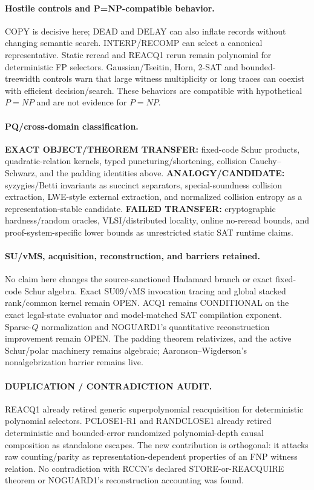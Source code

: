 \documentclass[11pt]{article}
\begin{document}
\paragraph{Hostile controls and P=NP-compatible behavior.}
COPY is decisive here; DEAD and DELAY can also inflate records without changing semantic search. INTERP/RECOMP can select a canonical representative. Static reread and REACQ1 rerun remain polynomial for deterministic FP selectors. Gaussian/Tseitin, Horn, 2-SAT and bounded-treewidth controls warn that large witness multiplicity or long traces can coexist with efficient decision/search. These behaviors are compatible with hypothetical $P=NP$ and are not evidence for $P=NP$.

\paragraph{PQ/cross-domain classification.}
\textbf{EXACT OBJECT/THEOREM TRANSFER:} fixed-code Schur products, quadratic-relation kernels, typed puncturing/shortening, collision Cauchy--Schwarz, and the padding identities above. \textbf{ANALOGY/CANDIDATE:} syzygies/Betti invariants as succinct separators, special-soundness collision extraction, LWE-style external extraction, and normalized collision entropy as a representation-stable candidate. \textbf{FAILED TRANSFER:} cryptographic hardness/random oracles, VLSI/distributed locality, online no-reread bounds, and proof-system-specific lower bounds as unrestricted static SAT runtime claims.

\paragraph{SU/vMS, acquisition, reconstruction, and barriers retained.}
No claim here changes the source-sanctioned Hadamard branch or exact fixed-code Schur algebra. Exact SU09/vMS invocation tracing and global stacked rank/common kernel remain OPEN. ACQ1 remains CONDITIONAL on the exact legal-state evaluator and model-matched SAT compilation exponent. Sparse-$Q$ normalization and NOGUARD1's quantitative reconstruction improvement remain OPEN. The padding theorem relativizes, and the active Schur/polar machinery remains algebraic; Aaronson--Wigderson's nonalgebrization barrier remains live.

\paragraph{DUPLICATION / CONTRADICTION AUDIT.}
REACQ1 already retired generic superpolynomial reacquisition for deterministic polynomial selectors. PCLOSE1-R1 and RANDCLOSE1 already retired deterministic and bounded-error randomized polynomial-depth causal composition as standalone escapes. The new contribution is orthogonal: it attacks raw counting/parity as representation-dependent properties of an FNP witness relation. No contradiction with RCCN's declared STORE-or-REACQUIRE theorem or NOGUARD1's reconstruction accounting was found.
\end{document}
